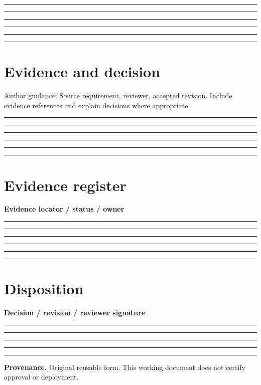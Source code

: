 \documentclass[11pt,letterpaper]{article}
\newcommand{\ResponseLine}{\par\vspace{1.05em}\noindent\rule{\linewidth}{0.4pt}\par}
\newcommand{\ResponseArea}{\ResponseLine\ResponseLine\ResponseLine}
\begin{document}
\ResponseArea\ResponseArea
\section{Evidence and decision}
Author guidance: Source requirement, reviewer, accepted revision. Include evidence references and explain decisions where appropriate.


\ResponseArea\ResponseArea
\section{Evidence register}
\textbf{Evidence locator / status / owner}\ResponseArea\ResponseArea
\section{Disposition}
\textbf{Decision / revision / reviewer signature}\ResponseArea\ResponseLine
\vfill
\hrule
{\footnotesize\textbf{Provenance.} Original reusable form. This working document does not certify approval or deployment.}
\end{document}
